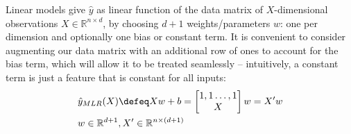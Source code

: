 Linear models give $\hat{y}$ as linear function of the data matrix of $X$-dimensional observations $X \in\mathbb{R}^{n\times d}$, by choosing $d+1$ weights/parameters $w$: one per dimension and optionally one bias or constant term. It is convenient to consider augmenting our data matrix with an additional row of ones to account for the bias term, which will allow it to be treated seamlessly -- intuitively, a constant term is just a feature that is constant for all inputs:
\begin{align}
    &\hat{y}_{MLR}(X)\defeq Xw + b = \begin{bmatrix}  1, 1 \hdots, 1 \\ X \end{bmatrix} w  = X'w\\
    &w\in \mathbb{R}^{d+1}, X'\in\mathbb{R}^{n\times(d+1)}
\end{align}